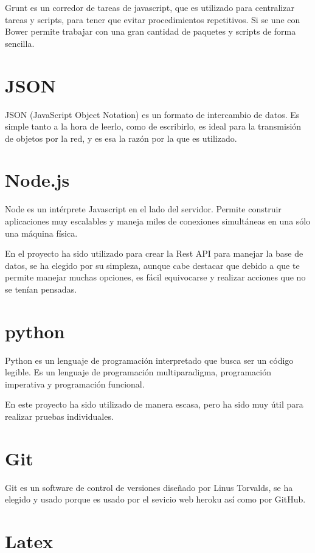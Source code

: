 Grunt es un corredor de tareas de javascript, que es utilizado para centralizar tareas y scripts, para tener que evitar procedimientos repetitivos. Si se une con Bower permite trabajar con una gran cantidad de paquetes y scripts de forma sencilla. 

\section{JSON}\label{JSON}
JSON (JavaScript Object Notation) es un formato de intercambio de datos. Es simple tanto a  la  hora de leerlo, como de escribirlo, es ideal para la transmisión de objetos por la red, y es esa la razón por la que es utilizado.

\section{Node.js}\label{Node.js}

Node es un intérprete Javascript en el lado del servidor. Permite construir aplicaciones muy escalables y  maneja miles de conexiones simultáneas en una sólo una máquina física.

En el proyecto ha sido utilizado para crear la Rest API para manejar la base de datos, se ha elegido por su simpleza, aunque cabe destacar que debido a que te permite manejar muchas opciones, es fácil equivocarse y realizar acciones que no se tenían pensadas.

\section{python}\label{python}

Python es un lenguaje de programación interpretado que busca ser un código legible. Es un lenguaje de programación multiparadigma, programación imperativa y programación funcional.

En este proyecto ha sido utilizado de manera escasa, pero ha sido muy útil para realizar pruebas individuales. 

\section{Git}\label{Git}

Git es un software de control de versiones diseñado por Linus Torvalds, se ha elegido y usado porque es usado por el sevicio web heroku así como por GitHub.

\section{Latex}\label{Latex}

